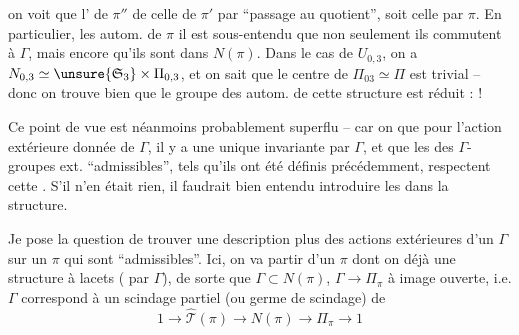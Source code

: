 
on voit que l' de $\pi''$  de celle de $\pi'$ par ``passage au quotient'', soit celle  par $\pi$.  En particulier,  les autom. de $\pi$ il est sous-entendu que  non seulement ils commutent à $\Gamma$, mais encore qu'ils sont dans $N(\pi)$.  Dans le cas de $U_{0,3}$, on a $N_{0,3}\simeq\unsure{\mathfrak S_3}\times\Pi_{0,3}$, et on sait que le centre de $\Pi_{03}\simeq\Pi$ est trivial -- donc on trouve bien que le groupe des autom. de cette structure est réduit :  !

Ce point de vue est néanmoins probablement superflu -- car on  que pour l'action extérieure donnée de $\Gamma$, il y a une unique  invariante par $\Gamma$, et que les   des $\Gamma$-groupes ext. ``admissibles'', tels qu'ils ont été définis précédemment, respectent  cette . S'il n'en était rien, il faudrait bien entendu introduire les  dans la structure.




Je  pose la question de trouver une description plus   des actions extérieures d'un $\Gamma$ sur un $\pi$ qui sont ``admissibles''.  Ici, on va partir d'un $\pi$ dont on  déjà une structure à lacets  ( par $\Gamma$), de  sorte que $\Gamma\subset N(\pi)$, $\Gamma\longrightarrow\Pi_\pi$  à image ouverte,  i.e. $\Gamma$ correspond à un scindage partiel (ou germe de scindage) de 
\[
1\longrightarrow\widehat{\mathcal T}(\pi)\longrightarrow N(\pi)\longrightarrow\Pi_\pi\longrightarrow1
\]

